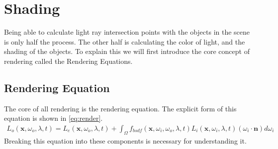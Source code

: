 \documentclass[../pbr.tex]{subfile}
\begin{document}
\section{Shading}%
\label{sec:shading}

Being able to calculate light ray intersection points with the objects in the
scene is only half the process. The other half is calculating the color of
light, and the shading of the objects. To explain this we will first introduce
the core concept of rendering called the Rendering Equations.

\subsection{Rendering Equation}%
\label{sub:rendering_equation}

The core of all rendering is the rendering equation. The explicit form of this
equation is shown in \ref{eq:render}.
\begin{align}\label{eq:render}
  L_o(\mathbf{x},\omega_o,\lambda,t)=L_e(\mathbf{x},\omega_o,\lambda,t)+\int_\Omega
  f_{bsdf}(\mathbf{x},\omega_i,\omega_o,\lambda,t)L_i(\mathbf{x},\omega_i,\lambda,t)(\omega_i\cdot\mathbf{n})d\omega_i
\end{align}
Breaking this equation into these components is necessary for understanding
it.
\end{document}
